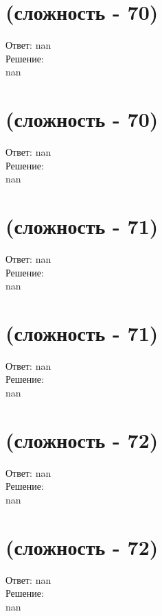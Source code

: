 \documentclass[a4paper,11pt]{article}%
\begin{document}
%
\section{(сложность {-} 70)}%
\label{sec:( {-} 70)}%
\hspace{3ex} Ответ: nan \\%
%
\hspace*{3ex} Решение: \\%
nan

%
\section{(сложность {-} 70)}%
\label{sec:( {-} 70)}%
\hspace{3ex} Ответ: nan \\%
%
\hspace*{3ex} Решение: \\%
nan

%
\section{(сложность {-} 71)}%
\label{sec:( {-} 71)}%
\hspace{3ex} Ответ: nan \\%
%
\hspace*{3ex} Решение: \\%
nan

%
\section{(сложность {-} 71)}%
\label{sec:( {-} 71)}%
\hspace{3ex} Ответ: nan \\%
%
\hspace*{3ex} Решение: \\%
nan

%
\section{(сложность {-} 72)}%
\label{sec:( {-} 72)}%
\hspace{3ex} Ответ: nan \\%
%
\hspace*{3ex} Решение: \\%
nan

%
\section{(сложность {-} 72)}%
\label{sec:( {-} 72)}%
\hspace{3ex} Ответ: nan \\%
%
\hspace*{3ex} Решение: \\%
nan
\end{document}
